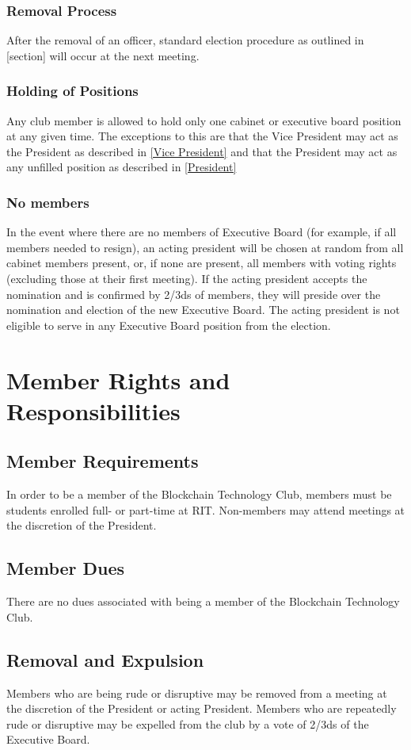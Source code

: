 \documentclass{article}
\begin{document}
\subsubsection{Removal Process}
After the removal of an officer, standard election procedure as outlined in [section] will occur at the next meeting.
\subsubsection{Holding of Positions}
Any club member is allowed to hold only one cabinet or executive board position at any given time.  The exceptions to this are that the Vice President may act as the President as described in \ref{Vice President} and that the President may act as any unfilled position as described in \ref{President}
\subsubsection{No members}
In the event where there are no members of Executive Board (for example, if all members needed to resign), an acting president will be chosen at random from all cabinet members present, or, if none are present, all members with voting rights (excluding those at their first meeting).  If the acting president accepts the nomination and is confirmed by 2/3ds of members, they will preside over the nomination and election of the new Executive Board.  The acting president is not eligible to serve in any Executive Board position from the election.
\section{Member Rights and Responsibilities}
\subsection{Member Requirements}
In order to be a member of the Blockchain Technology Club, members must be students enrolled full- or part-time at RIT.  Non-members may attend meetings at the discretion of the President.
\subsection{Member Dues}
There are no dues associated with being a member of the Blockchain Technology Club.
\subsection{Removal and Expulsion}
Members who are being rude or disruptive may be removed from a meeting at the discretion of the President or acting President.  Members who are repeatedly rude or disruptive may be expelled from the club by a vote of 2/3ds of the Executive Board.
\end{document}
